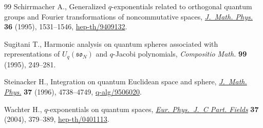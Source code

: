 \documentclass[11pt]{article}
\numberwithin{equation}{section}
\begin{document}
\begin{thebibliography}{99}
Schirrmacher A.,
Generalized $q$-exponentials related to orthogonal quantum groups and Fourier transformations of noncommutative spaces,
\href{http://dx.doi.org/10.1063/1.531136}{{\it J.~Math. Phys.}} {\bf36} (1995), 1531--1546,
\href{http://arxiv.org/abs/hep-th/9409132}{hep-th/9409132}.

Sugitani T.,
Harmonic analysis on quantum spheres associated with representations of $U_q(\mathfrak{so}_N)$ and $q$-Jacobi polynomials,
{\it Compositio Math.} {\bf 99} (1995), 249--281.

Steinacker H.,
Integration on quantum Euclidean space and sphere,
\href{http://dx.doi.org/10.1063/1.531658}{{\it J.~Math. Phys.}} {\bf 37} (1996), 4738--4749,
\href{http://arxiv.org/abs/q-alg/9506020}{q-alg/9506020}.

Wachter H.,
$q$-exponentials on quantum spaces,
\href{http://dx.doi.org/10.1140/epjc/s2004-01999-5}{{\it Eur. Phys.~J.~C Part. Fields}} {\bf37} (2004), 379--389,
\mbox{\href{http://arxiv.org/abs/hep-th/0401113}{hep-th/0401113}}.


\end{thebibliography}
\end{document}
